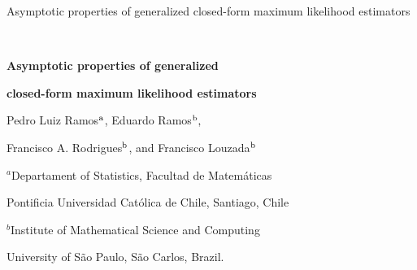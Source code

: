 \documentclass[12pt]{article} %
\theoremstyle{definition}
\begin{document}

\renewcommand{\baselinestretch}{2}


{\hfill {\footnotesize\rm Asymptotic properties of generalized closed-form maximum likelihood estimators} \hfill}

\renewcommand{\thefootnote}{}
$\ $\par


\fontsize{12}{14pt plus.8pt minus .6pt}\selectfont \vspace{0.8pc}
\centerline{\large\bf Asymptotic properties of generalized}\centerline{\large\bf closed-form maximum likelihood estimators}
\vspace{.4cm} \centerline{Pedro Luiz Ramos$^{\rm a}$, Eduardo Ramos$^{\rm b},$} \centerline{ Francisco A. Rodrigues$^{\rm b}$, and Francisco Louzada$^{\rm b}$}  
\vspace{.4cm}  \centerline{$^{a}${Departament of Statistics, Facultad de Matemáticas}}
\vspace{-.2cm} 
\centerline{{Pontificia Universidad Católica de Chile, Santiago, Chile}}
  \vspace{.2cm}  \centerline{$^{b}${Institute of Mathematical Science and Computing}}
\vspace{-.2cm} \centerline{University of S\~ao Paulo, S\~ao Carlos, Brazil.} \vspace{.3cm} \fontsize{9}{11.5pt plus.8pt minus
.6pt}\selectfont

\end{document}
